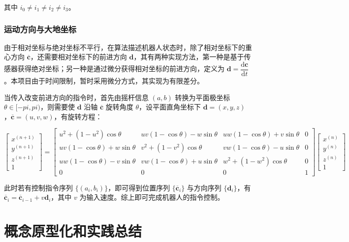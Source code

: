 \documentclass[a4paper]{ctexart}
\numberwithin{equation}{section}
\numberwithin{table}{section}
\numberwithin{figure}{section}
\begin{document}
其中 $i_0\neq i_1\neq i_2\neq i_3$。


\subsubsection{运动方向与大地坐标}

由于相对坐标与绝对坐标不平行，在算法描述机器人状态时，除了相对坐标下的重心方向 $\overline{\boldsymbol c}$，还需要相对坐标下的前进方向 $\boldsymbol d$，其有两种实现方法，第一种是基于传感器获得绝对坐标；另一种是通过微分获得相对坐标的前进方向，定义为 $\boldsymbol d=\dfrac{\mathrm d\boldsymbol c}{\mathrm d t}$。本项目由于时间限制，暂时采用微分方式，其实现为有限差分。

当传入改变前进方向的指令时，首先由摇杆信息 $(a,b)$ 转换为平面极坐标 $\theta \in [-pi,pi)$，则需要使 $\boldsymbol d$ 沿轴 $\overline{\boldsymbol c}$ 旋转角度 $\theta$，设平面直角坐标下 $\boldsymbol d=(x,y,z)$，$\overline{\boldsymbol c}=(u,v,w)$，有旋转方程：

\begin{equation}
  \begin{bmatrix}
    x^{(n+1)} \\
    y^{(n+1)} \\
    z^{(n+1)} \\
    1
  \end{bmatrix}
  =
  \begin{bmatrix}
    u^2+(1-u^2)\cos\theta & uv(1-\cos\theta)-w\sin\theta & uw(1-\cos\theta)+v\sin\theta & 0\\
    uv(1-\cos\theta)+w\sin\theta & v^2+(1-v^2)\cos\theta & vw(1-\cos\theta)-u\sin\theta & 0\\
    uw(1-\cos\theta)-v\sin\theta & vw(1-\cos\theta)+u\sin\theta & w^2+(1-w^2)\cos\theta & 0\\
    0 & 0 & 0 & 1
  \end{bmatrix}
  \begin{bmatrix}
    x^{(n)} \\
    y^{(n)} \\
    z^{(n)} \\
    1
  \end{bmatrix}
\end{equation}

此时若有控制指令序列 $\{(a_i,b_i)\}$，即可得到位置序列 $\{\overline{\boldsymbol c}_i\}$ 与方向序列 $\{\boldsymbol d_i\}$，有 $\overline{\boldsymbol c}_i = \overline{\boldsymbol c}_{i-1} + v\boldsymbol d_i$，其中 $v$ 为输入速度。综上即可完成机器人的指令控制。

\section{概念原型化和实践总结}
\end{document}
